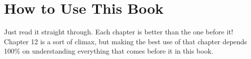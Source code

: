 \section{How to Use This Book}

Just read it straight through. Each chapter is better than the one before it! Chapter 12 is a sort of climax, but making the best use of that chapter depends 100\% on understanding everything that comes before it in this book.
